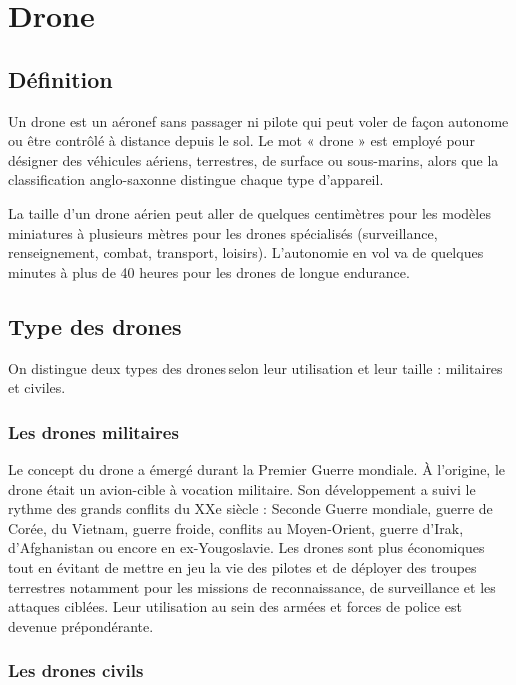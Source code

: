 
\chapter{Drone}

\section{Définition}

Un drone est un aéronef sans passager ni pilote qui peut voler de façon autonome ou être contrôlé à distance depuis le sol. Le mot « drone » est employé pour désigner des véhicules aériens, terrestres, de surface ou sous-marins, alors que la classification anglo-saxonne distingue chaque type d’appareil.  

La taille d’un drone aérien peut aller de quelques centimètres pour les modèles miniatures à plusieurs mètres pour les drones spécialisés (surveillance, renseignement, combat, transport, loisirs). L’autonomie en vol va de quelques minutes à plus de 40 heures pour les drones de longue endurance.  

\section{Type des drones}

On distingue deux types des drones selon leur utilisation et leur taille : militaires et civiles. 

\subsection{Les drones militaires}

Le concept du drone a émergé durant la Premier Guerre mondiale. À l’origine, le drone était un avion-cible à vocation militaire. Son développement a suivi le rythme des grands conflits du XXe siècle : Seconde Guerre mondiale, guerre de Corée, du Vietnam, guerre froide, conflits au Moyen-Orient, guerre d’Irak, d’Afghanistan ou encore en ex-Yougoslavie. Les drones sont plus économiques tout en évitant de mettre en jeu la vie des pilotes et de déployer des troupes terrestres notamment pour les missions de reconnaissance, de surveillance et les attaques ciblées. Leur utilisation au sein des armées et forces de police est devenue prépondérante.  

\subsection{Les drones civils }

